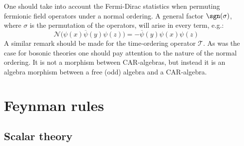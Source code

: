 
    \begin{remark}
        One should take into account the Fermi-Dirac statistics when permuting fermionic field operators under a normal ordering. A general factor $\sgn(\sigma)$, where $\sigma$ is the permutation of the operators, will arise in every term, e.g.: \[\mathcal{N}\Big(\psi(x)\overline\psi(y)\psi(z)\Big) = -\overline\psi(y)\psi(x)\psi(z)\] A similar remark should be made for the time-ordering operator $\mathcal{T}$. As was the case for bosonic theories one should pay attention to the nature of the normal ordering. It is not a morphism between CAR-algebras, but instead it is an algebra morphism between a free (odd) algebra and a CAR-algebra.
    \end{remark}

\section{Feynman rules}
\subsection{Scalar theory}

